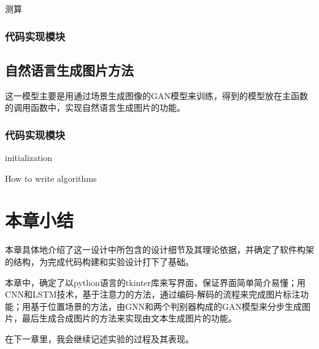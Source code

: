 测算
\subsubsection{代码实现模块}


\subsection{自然语言生成图片方法}
这一模型主要是用通过场景生成图像的GAN模型来训练，得到的模型放在主函数的调用函数中，实现自然语言生成图片的功能。


\subsubsection{代码实现模块}

\begin{algorithm}[H]
    \SetAlgoLined
     initialization\;
    \caption{How to write algorithms}
  \end{algorithm}
\section{本章小结}
本章具体地介绍了这一设计中所包含的设计细节及其理论依据，并确定了软件构架的结构，为完成代码构建和实验设计打下了基础。

本章中，确定了以python语言的tkinter库来写界面，保证界面简单简介易懂；用CNN和LSTM技术，基于注意力的方法，通过编码-解码的流程来完成图片标注功能；用基于位置场景的方法，由GNN和两个判别器构成的GAN模型来分步生成图片，最后生成合成图片的方法来实现由文本生成图片的功能。

在下一章里，我会继续记述实验的过程及其表现。



